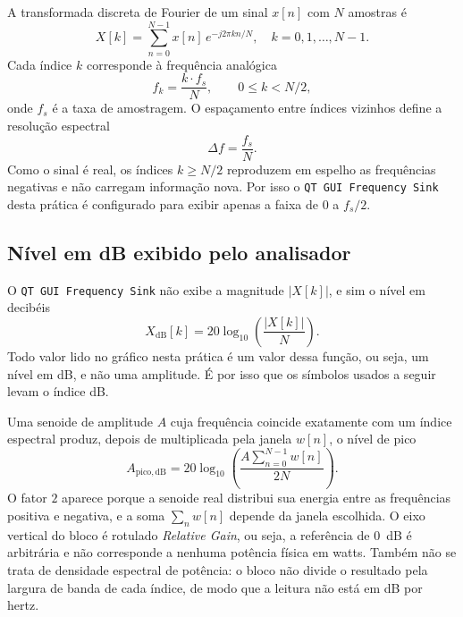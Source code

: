 \documentclass[11pt,a4paper]{article}
\begin{document}
A transformada discreta de Fourier de um sinal $x[n]$ com $N$ amostras é
\begin{equation}
  X[k] = \sum_{n=0}^{N-1} x[n]\,e^{-j2\pi kn/N}, \quad k = 0, 1, \ldots, N-1 .
\end{equation}
Cada índice $k$ corresponde à frequência analógica
\begin{equation}
  f_k = \frac{k \cdot f_s}{N}, \qquad 0 \le k < N/2 ,
  \label{eq:fk}
\end{equation}
onde $f_s$ é a taxa de amostragem. O espaçamento entre índices vizinhos
define a resolução espectral
\begin{equation}
  \Delta f = \frac{f_s}{N} .
  \label{eq:df}
\end{equation}
Como o sinal é real, os índices $k \ge N/2$ reproduzem em espelho as
frequências negativas e não carregam informação nova. Por isso o
\texttt{QT GUI Frequency Sink} desta prática é configurado para exibir apenas
a faixa de $0$ a $f_s/2$.

\subsection*{Nível em dB exibido pelo analisador}

O \texttt{QT GUI Frequency Sink} não exibe a magnitude $|X[k]|$, e sim o nível
em decibéis
\begin{equation}
  X_{\mathrm{dB}}[k] = 20\log_{10}\!\left(\frac{|X[k]|}{N}\right) .
  \label{eq:db}
\end{equation}
Todo valor lido no gráfico nesta prática é um valor dessa função, ou seja, um
nível em dB, e não uma amplitude. É por isso que os símbolos usados a seguir
levam o índice dB.

Uma senoide de amplitude $A$ cuja frequência coincide exatamente com um índice
espectral produz, depois de multiplicada pela janela $w[n]$, o nível de pico
\begin{equation}
  A_{\mathrm{pico,dB}}
    = 20\log_{10}\!\left(\frac{A \sum_{n=0}^{N-1} w[n]}{2N}\right) .
  \label{eq:pico}
\end{equation}
O fator $2$ aparece porque a senoide real distribui sua energia entre as
frequências positiva e negativa, e a soma $\sum_n w[n]$ depende da janela
escolhida. O eixo vertical do bloco é rotulado \textit{Relative Gain}, ou seja,
a referência de $0$~dB é arbitrária e não corresponde a nenhuma potência física
em watts. Também não se trata de densidade espectral de potência: o bloco não
divide o resultado pela largura de banda de cada índice, de modo que a leitura
não está em dB por hertz.
\end{document}
